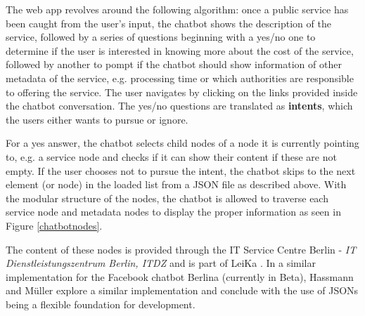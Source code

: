 The web app revolves around the following algorithm: once a public service has been caught from the user's input, the chatbot shows the description of the service, followed by a series of questions beginning with a yes/no one to determine if the user is interested in knowing more about the cost of the service, followed by another to pompt if the chatbot should show information of other metadata of the service, e.g. processing time or which authorities are responsible to offering the service. The user navigates by clicking on the links provided inside the chatbot conversation. 
The yes/no questions are translated as \textbf{intents}, which the users either wants to pursue or ignore.

For a yes answer, the chatbot selects child nodes of a node it is currently pointing to, e.g. a service node and checks if it can show their content if these are not empty. If the user chooses not to pursue the intent, the chatbot skips to the next element (or node) in the loaded list from a JSON file as described above. With the modular structure of the nodes, the chatbot is allowed to traverse each service node and metadata nodes to display the proper information as seen in Figure \ref{chatbotnodes}.


The content of these nodes is provided through the %
IT Service Centre Berlin - \textit{IT Dienstleistungszentrum Berlin, ITDZ} and is part of  %
LeiKa%
. In a similar implementation for the Facebook chatbot Berlina (currently in Beta), Hassmann and Müller \cite{hassmannMlr:berlina} explore a similar implementation and conclude with the use of JSONs being a flexible foundation for development.





%


	
